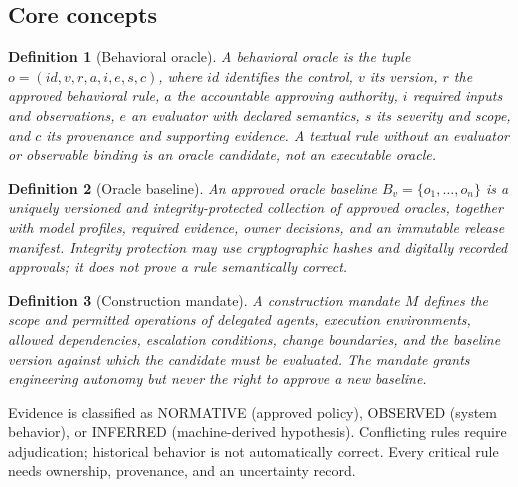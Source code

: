 \documentclass[11pt,a4paper]{article}
\newtheorem{definition}{Definition}
\begin{document}
\subsection{Core concepts}
\begin{definition}[Behavioral oracle]
A behavioral oracle is the tuple $o=(id, v, r, a, i, e, s, c)$, where $id$ identifies the control, $v$ its version, $r$ the approved behavioral rule, $a$ the accountable approving authority, $i$ required inputs and observations, $e$ an evaluator with declared semantics, $s$ its severity and scope, and $c$ its provenance and supporting evidence. A textual rule without an evaluator or observable binding is an \emph{oracle candidate}, not an executable oracle.
\end{definition}
\begin{definition}[Oracle baseline]
An approved oracle baseline $B_v=\{o_1,\dots,o_n\}$ is a uniquely versioned and integrity-protected collection of approved oracles, together with model profiles, required evidence, owner decisions, and an immutable release manifest. Integrity protection may use cryptographic hashes and digitally recorded approvals; it does not prove a rule semantically correct.
\end{definition}
\begin{definition}[Construction mandate]
A construction mandate $M$ defines the scope and permitted operations of delegated agents, execution environments, allowed dependencies, escalation conditions, change boundaries, and the baseline version against which the candidate must be evaluated. The mandate grants engineering autonomy but never the right to approve a new baseline.
\end{definition}

Evidence is classified as \textsf{NORMATIVE} (approved policy), \textsf{OBSERVED} (system behavior), or \textsf{INFERRED} (machine-derived hypothesis). Conflicting rules require adjudication; historical behavior is not automatically correct. Every critical rule needs ownership, provenance, and an uncertainty record.
\end{document}
